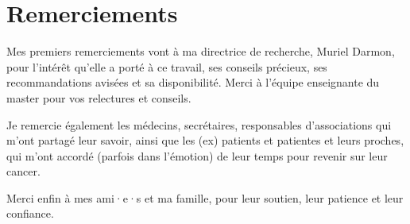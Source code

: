 \documentclass[
  12pt,
]{article}
\begin{document}
\section*{Remerciements}

\vspace{5mm}

Mes premiers remerciements vont à ma directrice de recherche, Muriel
Darmon, pour l'intérêt qu'elle a porté à ce travail, ses conseils
précieux, ses recommandations avisées et sa disponibilité. Merci à
l'équipe enseignante du master pour vos relectures et conseils.

\vspace{5mm}

Je remercie également les médecins, secrétaires, responsables
d'associations qui m'ont partagé leur savoir, ainsi que les (ex)
patients et patientes et leurs proches, qui m'ont accordé (parfois dans
l'émotion) de leur temps pour revenir sur leur cancer.

\vspace{5mm}

Merci enfin à mes ami·e·s et ma famille, pour leur soutien, leur
patience et leur confiance.

\vspace{.5cm}

\newpage
\end{document}
